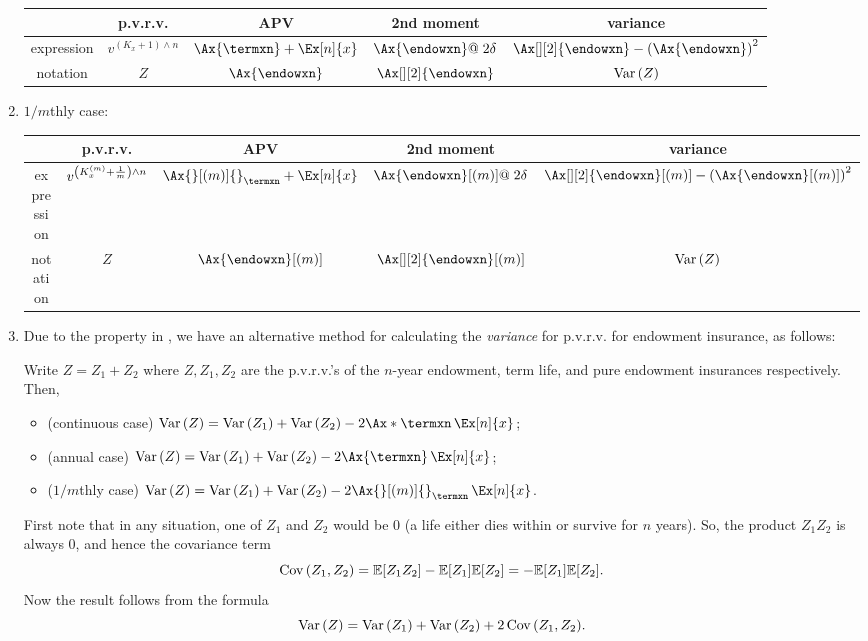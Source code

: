 \begin{enumerate}
\begin{tabular}{ccccc}
\toprule
&p.v.r.v.&APV&2nd moment&variance\\
\midrule
expression&\(v^{(K_x+1)\wedge n}\)&\(\Ax{\termxn}+\Ex[n]{x}\)
&\(\Ax{\endowxn}@\;2\delta\)&\(\Ax[][2]{\endowxn}-\qty(\Ax{\endowxn})^2\)\\
notation&\(Z\)&\(\Ax{\endowxn}\)
&\(\Ax[][2]{\endowxn}\)
&\(\operatorname{Var}\qty(Z)\)\\
\bottomrule
\end{tabular}

\item \label{it:1m-endow-fmlas}
\(1/m\)thly case:

\begin{tabular}{ccccc}
\toprule
&p.v.r.v.&APV&2nd moment&variance\\
\midrule
expression&\(v^{\qty(K_x^{(m)}+\frac{1}{m})\wedge n}\)&\(\Ax{}[(m)]{}_{\termxn}+\Ex[n]{x}\)
&\(\Ax{\endowxn}[(m)]@\;2\delta\)&\(\Ax[][2]{\endowxn}[(m)]-\qty(\Ax{\endowxn}[(m)])^2\)\\
notation&\(Z\)&\(\Ax{\endowxn}[(m)]\)
&\(\Ax[][2]{\endowxn}[(m)]\)
&\(\operatorname{Var}\qty(Z)\)\\
\bottomrule
\end{tabular}

\item Due to the property in , we have an
alternative method for calculating the \emph{variance} for p.v.r.v. for
endowment insurance, as follows:
\begin{proposition}
\label{prp:endow-var-alt-fmla}
Write \(Z=Z_1+Z_2\) where \(Z,Z_1,Z_2\) are the p.v.r.v.'s of the \(n\)-year
endowment, term life, and pure endowment insurances respectively. Then,
\begin{itemize}
\item (continuous case) \(\vari{Z}=\vari{Z_1}+\vari{Z_2}-2\Ax*{\termxn}\,\Ex[n]{x}\);
\item (annual case) \(\vari{Z}=\vari{Z_1}+\vari{Z_2}-2\Ax{\termxn}\,\Ex[n]{x}\);
\item (\(1/m\)thly case) \(\vari{Z}=\vari{Z_1}+\vari{Z_2}-2\Ax{}[(m)]{}_{\termxn}\,\Ex[n]{x}\).
\end{itemize}
\end{proposition}
\begin{pf}
First note that in any situation, one of \(Z_1\) and \(Z_2\) would be 0 (a life
either dies within or survive for \(n\) years). So, the product \(Z_1Z_2\) is
always 0, and hence the covariance term
\[\operatorname{Cov}\qty(Z_1,Z_2)=\mathbb{E}\qty[Z_1Z_2]-\mathbb{E}\qty[Z_1]\mathbb{E}\qty[Z_2]=-\mathbb{E}\qty[Z_1]\mathbb{E}\qty[Z_2].\]
Now the result follows from the formula
\[
\operatorname{Var}\qty(Z)=\operatorname{Var}\qty(Z_1)+\operatorname{Var}\qty(Z_2)+2\operatorname{Cov}\qty(Z_1,Z_2).
\]
\end{pf}
\end{enumerate}
